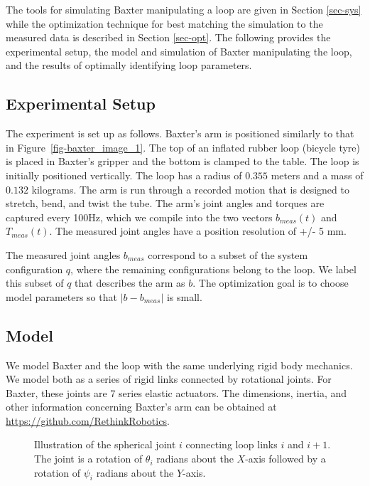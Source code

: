 \documentclass[letterpaper, 10pt, conference]{ieeeconf}
\begin{document}
The tools for simulating Baxter manipulating a loop are given in Section \ref{sec-sys} while the optimization technique for best matching the simulation to the measured data is described in Section \ref{sec-opt}.  The following provides the experimental setup, the model and simulation of Baxter manipulating the loop, and the results of optimally identifying loop parameters.

\subsection{Experimental Setup \label{sec-setup}}

The experiment is set up as follows.  Baxter's arm is positioned similarly to that in Figure~\ref{fig-baxter_image_1}.  The top of an inflated rubber loop (bicycle tyre) is placed in Baxter's gripper and the bottom is clamped to the table.   The loop is initially positioned vertically. The loop has a radius of $0.355$ meters and a mass of $0.132$ kilograms.  The arm is run through a recorded motion that is designed to stretch, bend, and twist the tube. The arm's joint angles and torques are captured every 100Hz, which we compile into the two vectors $b_{meas}(t)$ and $T_{meas}(t)$.  The measured joint angles have a position resolution of +/- 5 mm.

The measured joint angles $b_{meas}$ correspond to a subset of the system configuration $q$, where the remaining configurations belong to the loop.  We label this subset of $q$ that describes the arm as $b$.  The optimization goal is to choose model parameters so that $|b-b_{meas}|$ is small.

\subsection{Model}
We model Baxter and the loop with the same underlying rigid body mechanics.  We model both as a series of rigid links connected by rotational joints.  For Baxter, these joints are 7 series elastic actuators.  The dimensions,  inertia, and other information concerning Baxter's arm can be obtained at \url{https://github.com/RethinkRobotics}.  

\begin{figure}[!htb]
\centering
\def\svgwidth{.97\textwidth}%

\caption{Illustration of the spherical joint $i$ connecting loop links $i$ and $i+1$.  The joint is a rotation of $\theta_i$ radians about the $X$-axis followed by a rotation of $\psi_i$ radians about the $Y$-axis. }
\label{fig-loop_link}
\end{figure}
\end{document}
